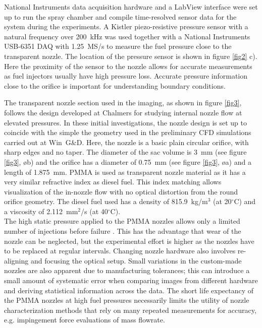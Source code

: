 \documentclass[letterpaper,twocolumn,10pt]{ilass}
\begin{document}
National Instruments data acquisition hardware and a LabView interface were set up to run
the spray chamber and compile time-resolved sensor data for the system during the experiments.
%
A Kistler piezo-resistive pressure sensor with a natural frequency over 200~kHz was used
together with a National Instruments USB-6351 DAQ with 1.25~MS/s to measure the fuel pressure
close to the transparent nozzle. The location of the pressure sensor is shown in figure
\ref{fig2} c).
Here the proximity of the sensor to the nozzle allows for accurate measurements as
fuel injectors usually have high pressure loss. Accurate pressure information close to the
orifice is important for understanding boundary conditions.
%

The transparent nozzle section used in the imaging, as shown in figure \ref{fig3},
follows the design developed at Chalmers for studying internal nozzle flow at elevated
pressures\cite{Falgout2016}.
%
In these initial investigations, the nozzle design is set up to coincide with the
simple the geometry used in the preliminary CFD simulations carried out at Win~G\&D.
%
Here, the nozzle is a basic plain circular orifice, with sharp edges and no taper.
The diameter of the sac volume is 3~mm (see figure \ref{fig3},  {\o b}) and the orifice has a diameter of 0.75~mm (see figure \ref{fig3},  {\o a}) and a length of 1.875~mm.
%
PMMA is used as transparent nozzle material as it has a very similar refractive index as
diesel fuel. This index matching allows visualization of the in-nozzle flow with no optical
distortion from the round orifice geometry. The diesel fuel used has a density of
815.9~kg/m$^3$ (at 20$^{\circ}$C) and a viscosity of 2.112~mm$^2$/s (at 40$^{\circ}$C).\\
%
The high static pressure applied to the PMMA nozzles allows only a limited number of injections
before failure \cite{Falgout2016}. This has the advantage that wear of the nozzle can be
neglected, but the experimental effort is higher as the nozzles have to be replaced at regular
intervals. Changing nozzle hardware also involves re-aligning and focusing the optical setup.
%
Small variations in the custom-made nozzles are also apparent due to manufacturing tolerances; this can introduce a small amount of systematic error when comparing images from different
hardware and deriving statistical information across the data.
%
The short life expectancy of the PMMA nozzles at high fuel pressures necessarily limits
the utility of nozzle characterization methods that rely on many repeated measurements
for accuracy, e.g. impingement force evaluations of mass flowrate.
%
\end{document}
